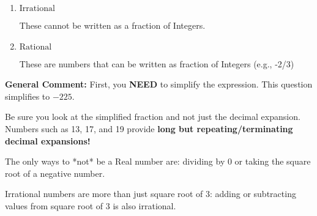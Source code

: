 \documentclass{extbook}[14pt]
\begin{document}
\begin{enumerate}
{\begin{enumerate}[label=\Alph*.]
* This is the correct option!
\item \( \text{Irrational} \)

These cannot be written as a fraction of Integers.
\item \( \text{Rational} \)

These are numbers that can be written as fraction of Integers (e.g., -2/3)
\end{enumerate}

\textbf{General Comment:} First, you \textbf{NEED} to simplify the expression. This question simplifies to $-225$. 
 
 Be sure you look at the simplified fraction and not just the decimal expansion. Numbers such as 13, 17, and 19 provide \textbf{long but repeating/terminating decimal expansions!} 
 
 The only ways to *not* be a Real number are: dividing by 0 or taking the square root of a negative number. 
 
 Irrational numbers are more than just square root of 3: adding or subtracting values from square root of 3 is also irrational.
}
\end{enumerate}
\end{document}
